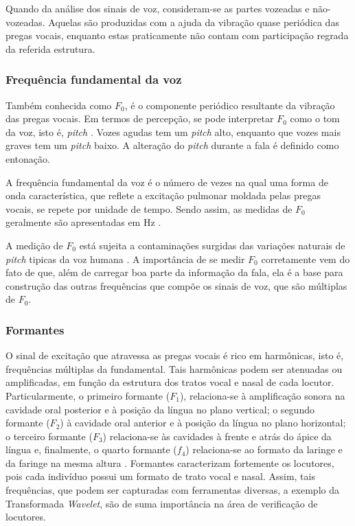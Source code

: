 			\par Quando da análise dos sinais de voz, consideram-se as partes vozeadas e não-vozeadas. Aquelas são produzidas com a ajuda da vibração quase periódica das pregas vocais, enquanto estas praticamente não contam com participação regrada da referida estrutura.
			
			\subsubsection{Frequência fundamental da voz}
				\par Também conhecida como $F_0$, é o componente periódico resultante da vibração das pregas vocais. Em termos de percepção, se pode interpretar $F_0$ como o tom da voz, isto é, \textit{pitch} \cite{kremer2014eficiencia}. Vozes agudas tem um \textit{pitch} alto, enquanto que vozes mais graves tem um \textit{pitch} baixo. A alteração do \textit{pitch} durante a fala é definido como entonação.
				
				\par A frequência fundamental da voz é o número de vezes na qual uma forma de onda característica, que reflete a excitação pulmonar moldada pelas pregas vocais, se repete por unidade de tempo. Sendo assim, as medidas de $F_0$ geralmente são apresentadas em Hz \cite{freitas2013avaliaccao}.
			
				\par A medição de $F_0$ está sujeita a contaminações surgidas das variações naturais de \textit{pitch} tipicas da voz humana \cite{freitas2013avaliaccao}. A importância de se medir $F_0$ corretamente vem do fato de que, além de carregar boa parte da informação da fala, ela é a base para construção das outras frequências que compõe os sinais de voz, que são múltiplas de $F_0$.
				
				\subsubsection{Formantes}
					\par O sinal de excitação que atravessa as pregas vocais é rico em harmônicas, isto é, frequências múltiplas da fundamental. Tais harmônicas podem ser atenuadas ou amplificadas, em função da estrutura dos tratos vocal e nasal de cada locutor. Particularmente, o primeiro formante ($F_1$), relaciona-se à  amplificação  sonora  na  cavidade  oral  posterior  e  à  posição  da  língua  no  plano  vertical;  o segundo  formante  ($F_2$)  à  cavidade  oral  anterior  e  à  posição  da  língua  no  plano  horizontal; o terceiro  formante  ($F_3$)  relaciona-se  às  cavidades  à  frente  e  atrás  do  ápice  da  língua e, finalmente,  o  quarto formante  ($f_4$) relaciona-se  ao  formato  da  laringe  e  da  faringe  na  mesma  altura  \cite{valencca2014analise}. Formantes caracterizam fortemente os locutores, pois cada indivíduo possui um formato de trato vocal e nasal. Assim, tais frequências, que podem ser capturadas com ferramentas diversas, a exemplo da Transformada \textit{Wavelet}, são de suma importância na área de verificação de locutores.

